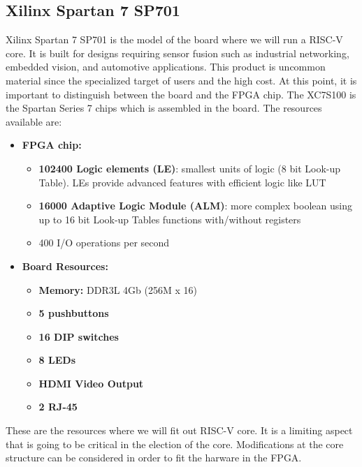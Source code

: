 \subsection{Xilinx Spartan 7 SP701} \label{sec:fpga}
Xilinx Spartan 7 SP701 is the model of the board where we will run a RISC-V core. It is built for designs requiring sensor fusion such as industrial networking, embedded vision, and automotive applications. This product is uncommon material since the specialized target of users and the high cost. At this point, it is important to distinguish between the board and the FPGA chip. The XC7S100 is the Spartan Series 7 chips which is assembled in the board. The resources available are:  

\begin{itemize}
	\item \textbf{FPGA chip:}
	\begin{itemize}
		\item \textbf{102400 Logic elements (LE)}: smallest units of logic (8 bit Look-up Table). LEs  provide advanced features with efficient logic like LUT
	   	\item \textbf{16000 Adaptive Logic Module (ALM)}: more complex boolean using up to 16 bit Look-up Tables functions with/without registers
	    	\item 400 I/O operations per second %
	\end{itemize}
	\item \textbf{Board  Resources:}
	\begin{itemize}
		\item \textbf{Memory:} DDR3L 4Gb (256M x 16)
		\item \textbf{5 pushbuttons}
		\item \textbf{16 DIP switches}
		\item \textbf{8 LEDs}
		\item \textbf{HDMI Video Output}
		\item \textbf{2 RJ-45}
		
	\end{itemize}
\end{itemize}

These are the resources where we will fit out RISC-V core. It is a limiting aspect that is going to be critical in the election of the core. Modifications at the core structure can be considered in order to fit the harware in the FPGA. 




